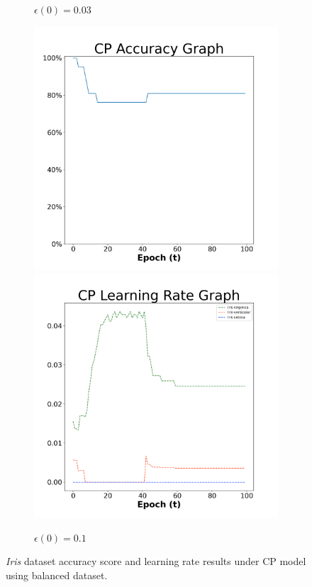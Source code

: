 \begin{figure}[H]
\begin{subfigure}{0.3\textwidth}
  \caption{$\epsilon(0)=0.03$}
\end{subfigure}\hfil %
\begin{subfigure}{0.3\textwidth}
  \includegraphics[width=\linewidth]{images/exper1/iris/CP_0.1_acc.png}
  \includegraphics[width=\linewidth]{images/exper1/iris/CP_0.1_lr.png}
  \caption{$\epsilon(0)=0.1$}
\end{subfigure}

\caption{\textit{Iris} dataset accuracy score and learning rate results under CP model using balanced dataset.}
\end{figure}


